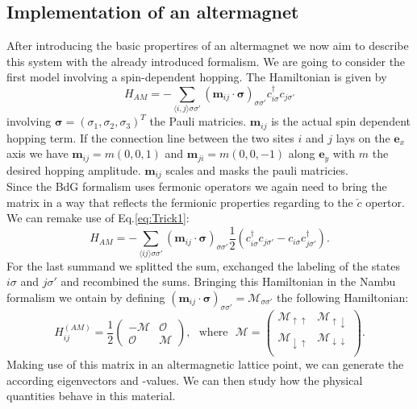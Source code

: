 \documentclass[../main.tex]{main.tex}
\begin{document}
\subsection{Implementation of an altermagnet}
After introducing the basic propertires of an altermagnet we now aim to describe this system with the already introduced formalism.
We are going to consider the first model involving a spin-dependent hopping. The Hamiltonian is given by
\begin{equation*}
    H_{AM} = -\sum_{\langle i, j\rangle\sigma\sigma'} \left(\bm{m}_{ij} \cdot \bm{\sigma}\right)_{\sigma\sigma'} c_{i\sigma}^{\dagger} c_{j\sigma'} 
\end{equation*}
involving $\bm{\sigma}=(\sigma_1, \sigma_2,\sigma_3)^T$ the Pauli matricies. $\bm{m}_{ij}$ is the actual spin dependent hopping term. If the connection line 
between the two sites $i$ and $j$ lays on the $\bm{e}_x$ axis we have $\bm{m}_{ij} = m(0,0,1)$ and $\bm{m}_{ji} = m(0,0,-1)$ along $\bm{e}_y$ with $m$ 
the desired hopping amplitude. $\bm{m}_{ij}$ scales and masks the pauli matricies.\\

Since the BdG formalism uses fermonic operators we again need to bring the matrix in a way that reflects the fermionic properties regarding to the $\check{c}$ opertor.
We can remake use of Eq.\ref{eq:Trick1}:
\begin{equation*}
    H_{AM} = -\sum_{\langle i j\rangle\sigma\sigma'} \left(\bm{m}_{ij} \cdot \bm{\sigma}\right)_{\sigma\sigma'} \frac{1}{2}\left(c_{i\sigma}^{\dagger} c_{j\sigma'} - c_{i\sigma}c_{j\sigma'}^{\dagger}\right).
\end{equation*}
For the last summand we splitted the sum, exchanged the labeling of the states $i\sigma$ and $j\sigma'$ and recombined the sums.
Bringing this Hamiltonian in the Nambu formalism we ontain by defining
$\left(\bm{m}_{ij} \cdot \bm{\sigma}\right)_{\sigma\sigma'} = \mathcal{M}_{\sigma\sigma'}$ 
the following Hamiltonian:
\begin{equation*}
    H^{(AM)}_{ij} = \frac{1}{2}\begin{pmatrix}
        -\mathcal{M} & \mathcal{O}\\
        \mathcal{O} & \mathcal{M}
    \end{pmatrix}
    ,~~~ \text{where} ~~~ \mathcal{M} = \begin{pmatrix}
        \mathcal{M}_{\uparrow\uparrow} & \mathcal{M}_{\uparrow\downarrow}\\
        \mathcal{M}_{\downarrow\uparrow} & \mathcal{M}_{\downarrow\downarrow}\\
    \end{pmatrix}.
\end{equation*}
Making use of this matrix in an altermagnetic lattice point, we can generate the according eigenvectors and -values. We can then study how the physical quantities 
behave in this material.\\
\end{document}
